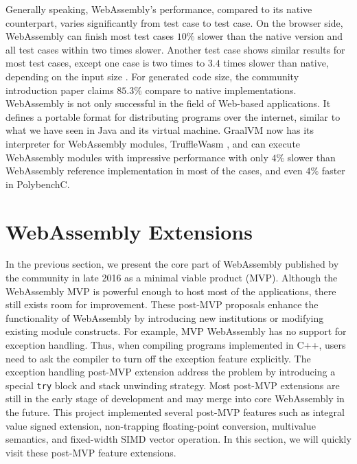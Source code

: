Generally speaking, WebAssembly's performance, compared to its native counterpart, varies significantly from test case to test case. On the browser side, WebAssembly can finish most test cases $10\%$ slower than the native version and all test cases within two times slower. Another test case shows similar results for most test cases, except one case is two times to $3.4$ times slower than native, depending on the input size \cite{234914}. For generated code size, the community introduction paper claims $85.3\%$ compare to native implementations. WebAssembly is not only successful in the field of Web-based applications. It defines a portable format for distributing programs over the internet, similar to what we have seen in Java and its virtual machine. GraalVM now has its interpreter for WebAssembly modules, TruffleWasm \cite{trufflewasm}, and can execute WebAssembly modules with impressive performance with only $4\%$ slower than WebAssembly reference implementation in most of the cases, and even $4\%$ faster in PolybenchC.

\section{WebAssembly Extensions}

In the previous section, we present the core part of WebAssembly published by the community in late 2016 as a minimal viable product (MVP). Although the WebAssembly MVP is powerful enough to host most of the applications\cite{webassembly-survey}, there still exists room for improvement. These post-MVP proposals enhance the functionality of WebAssembly by introducing new institutions or modifying existing module constructs. For example, MVP WebAssembly has no support for exception handling. Thus, when compiling programs implemented in C++, users need to ask the compiler to turn off the exception feature explicitly. The exception handling post-MVP extension address the problem by introducing a special \texttt{try} block and stack unwinding strategy. Most post-MVP extensions are still in the early stage of development and may merge into core WebAssembly in the future. This project implemented several post-MVP features such as integral value signed extension, non-trapping floating-point conversion, multivalue semantics, and fixed-width SIMD vector operation. In this section, we will quickly visit these post-MVP feature extensions. 

